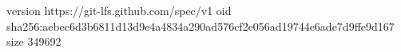 version https://git-lfs.github.com/spec/v1
oid sha256:aebec6d3b6811d13d9e4a4834a290ad576cf2e056ad19744e6ade7d9ffe9d167
size 349692
